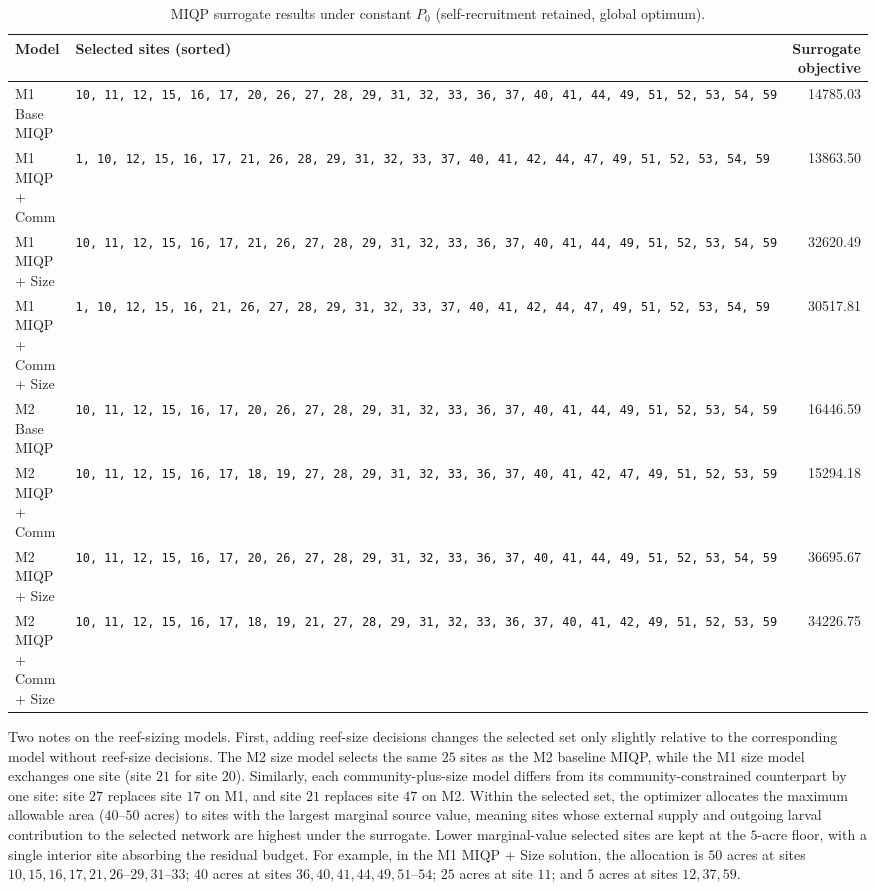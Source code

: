 \documentclass[11pt]{article}
\begin{document}
\begin{table}[H]
\centering
\caption{MIQP surrogate results under constant $P_0$ (self-recruitment retained, global optimum).}
\label{tab:miqp}
\small
\begin{tabularx}{\linewidth}{@{}l X r@{}}
\toprule
\textbf{Model} & \textbf{Selected sites (sorted)} & \textbf{Surrogate objective} \\
\midrule
M1 Base MIQP & \texttt{10,\ 11,\ 12,\ 15,\ 16,\ 17,\ 20,\ 26,\ 27,\ 28,\ 29,\ 31,\ 32,\ 33,\ 36,\ 37,\ 40,\ 41,\ 44,\ 49,\ 51,\ 52,\ 53,\ 54,\ 59} & 14785.03 \\
M1 MIQP + Comm & \texttt{1,\ 10,\ 12,\ 15,\ 16,\ 17,\ 21,\ 26,\ 28,\ 29,\ 31,\ 32,\ 33,\ 37,\ 40,\ 41,\ 42,\ 44,\ 47,\ 49,\ 51,\ 52,\ 53,\ 54,\ 59} & 13863.50 \\
M1 MIQP + Size & \texttt{10,\ 11,\ 12,\ 15,\ 16,\ 17,\ 21,\ 26,\ 27,\ 28,\ 29,\ 31,\ 32,\ 33,\ 36,\ 37,\ 40,\ 41,\ 44,\ 49,\ 51,\ 52,\ 53,\ 54,\ 59} & 32620.49 \\
M1 MIQP + Comm + Size & \texttt{1,\ 10,\ 12,\ 15,\ 16,\ 21,\ 26,\ 27,\ 28,\ 29,\ 31,\ 32,\ 33,\ 37,\ 40,\ 41,\ 42,\ 44,\ 47,\ 49,\ 51,\ 52,\ 53,\ 54,\ 59} & 30517.81 \\
\midrule
M2 Base MIQP & \texttt{10,\ 11,\ 12,\ 15,\ 16,\ 17,\ 20,\ 26,\ 27,\ 28,\ 29,\ 31,\ 32,\ 33,\ 36,\ 37,\ 40,\ 41,\ 44,\ 49,\ 51,\ 52,\ 53,\ 54,\ 59} & 16446.59 \\
M2 MIQP + Comm & \texttt{10,\ 11,\ 12,\ 15,\ 16,\ 17,\ 18,\ 19,\ 27,\ 28,\ 29,\ 31,\ 32,\ 33,\ 36,\ 37,\ 40,\ 41,\ 42,\ 47,\ 49,\ 51,\ 52,\ 53,\ 59} & 15294.18 \\
M2 MIQP + Size & \texttt{10,\ 11,\ 12,\ 15,\ 16,\ 17,\ 20,\ 26,\ 27,\ 28,\ 29,\ 31,\ 32,\ 33,\ 36,\ 37,\ 40,\ 41,\ 44,\ 49,\ 51,\ 52,\ 53,\ 54,\ 59} & 36695.67 \\
M2 MIQP + Comm + Size & \texttt{10,\ 11,\ 12,\ 15,\ 16,\ 17,\ 18,\ 19,\ 21,\ 27,\ 28,\ 29,\ 31,\ 32,\ 33,\ 36,\ 37,\ 40,\ 41,\ 42,\ 49,\ 51,\ 52,\ 53,\ 59} & 34226.75 \\
\bottomrule
\end{tabularx}
\end{table}

Two notes on the reef-sizing models. First, adding reef-size decisions changes the selected set only slightly relative to the corresponding model without reef-size decisions. The M2 size model selects the same $25$ sites as the M2 baseline MIQP, while the M1 size model exchanges one site (site $21$ for site $20$). Similarly, each community-plus-size model differs from its community-constrained counterpart by one site: site $27$ replaces site $17$ on M1, and site $21$ replaces site $47$ on M2. Within the selected set, the optimizer allocates the maximum allowable area ($40$--$50$ acres) to sites with the largest marginal source value, meaning sites whose external supply and outgoing larval contribution to the selected network are highest under the surrogate. Lower marginal-value selected sites are kept at the $5$-acre floor, with a single interior site absorbing the residual budget. For example, in the M1 MIQP + Size solution, the allocation is $50$ acres at sites $10, 15, 16, 17, 21, 26$--$29, 31$--$33$; $40$ acres at sites $36, 40, 41, 44, 49, 51$--$54$; $25$ acres at site $11$; and $5$ acres at sites $12, 37, 59$.
\end{document}
